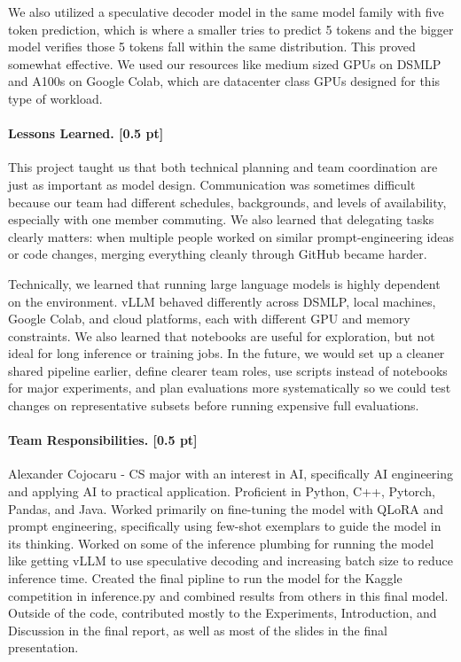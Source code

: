 \documentclass{article}
\begin{document}
We also utilized a speculative decoder model in the same model family with five token prediction, which is where a smaller tries to predict 5 tokens and the bigger model verifies those 5 tokens fall within the same distribution. This proved somewhat effective. We used our resources like medium sized GPUs on DSMLP and A100s on Google Colab, which are datacenter class GPUs designed for this type of workload.

\paragraph{Lessons Learned. [0.5 pt]}
This project taught us that both technical planning and team coordination are just as important as model design. Communication was sometimes difficult because our team had different schedules, backgrounds, and levels of availability, especially with one member commuting. We also learned that delegating tasks clearly matters: when multiple people worked on similar prompt-engineering ideas or code changes, merging everything cleanly through GitHub became harder.

Technically, we learned that running large language models is highly dependent on the environment. vLLM behaved differently across DSMLP, local machines, Google Colab, and cloud platforms, each with different GPU and memory constraints. We also learned that notebooks are useful for exploration, but not ideal for long inference or training jobs. In the future, we would set up a cleaner shared pipeline earlier, define clearer team roles, use scripts instead of notebooks for major experiments, and plan evaluations more systematically so we could test changes on representative subsets before running expensive full evaluations.


\paragraph{Team Responsibilities. [0.5 pt]}

Alexander Cojocaru - CS major with an interest in AI, specifically AI engineering and applying AI to practical application. Proficient in Python, C++, Pytorch, Pandas, and Java. Worked primarily on fine-tuning the model with QLoRA and prompt engineering, specifically using few-shot exemplars to guide the model in its thinking. Worked on some of the inference plumbing for running the model like getting vLLM to use speculative decoding and increasing batch size to reduce inference time. Created the final pipline to run the model for the Kaggle competition in inference.py and combined results from others in this final model. Outside of the code, contributed mostly to the Experiments, Introduction, and Discussion in the final report, as well as most of the slides in the final presentation.
\end{document}
